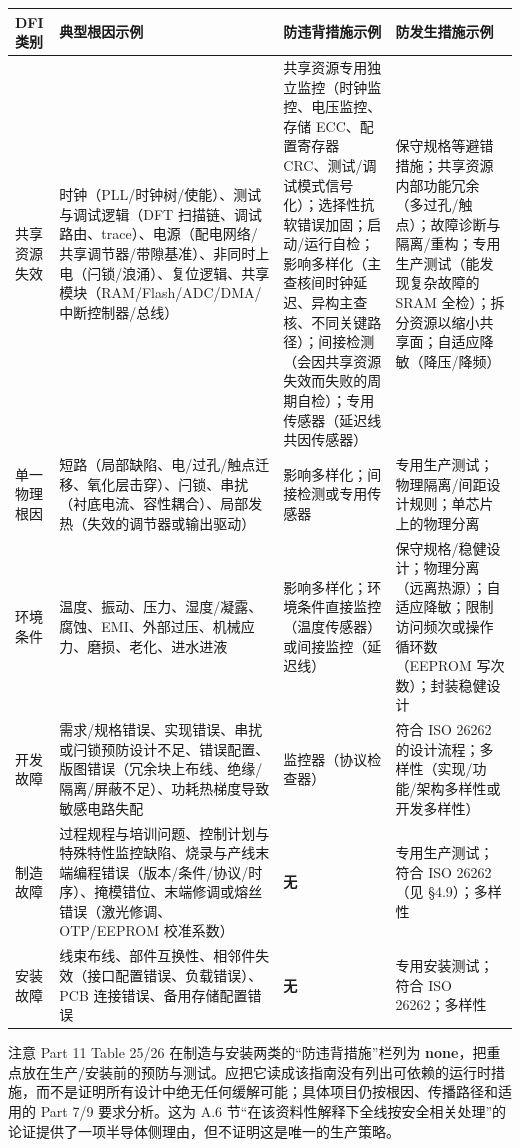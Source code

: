 \begingroup\small
\setlength{\tabcolsep}{4pt}
\begin{xltabular}{\linewidth}{@{}XXXX@{}}
\toprule
DFI 类别 & 典型根因示例 & 防违背措施示例 & 防发生措施示例 \\
\midrule
\endhead
共享资源失效 & 时钟（PLL/时钟树/使能）、测试与调试逻辑（DFT 扫描链、调试路由、trace）、电源（配电网络/共享调节器/带隙基准）、非同时上电（闩锁/浪涌）、复位逻辑、共享模块（RAM/Flash/ADC/DMA/中断控制器/总线） & 共享资源专用独立监控（时钟监控、电压监控、存储 ECC、配置寄存器 CRC、测试/调试模式信号化）；选择性抗软错误加固；启动/运行自检；影响多样化（主查核间时钟延迟、异构主查核、不同关键路径）；间接检测（会因共享资源失效而失败的周期自检）；专用传感器（延迟线共因传感器） & 保守规格等避错措施；共享资源内部功能冗余（多过孔/触点）；故障诊断与隔离/重构；专用生产测试（能发现复杂故障的 SRAM 全检）；拆分资源以缩小共享面；自适应降敏（降压/降频） \\
单一物理根因 & 短路（局部缺陷、电/过孔/触点迁移、氧化层击穿）、闩锁、串扰（衬底电流、容性耦合）、局部发热（失效的调节器或输出驱动） & 影响多样化；间接检测或专用传感器 & 专用生产测试；物理隔离/间距设计规则；单芯片上的物理分离 \\
环境条件 & 温度、振动、压力、湿度/凝露、腐蚀、EMI、外部过压、机械应力、磨损、老化、进水进液 & 影响多样化；环境条件直接监控（温度传感器）或间接监控（延迟线） & 保守规格/稳健设计；物理分离（远离热源）；自适应降敏；限制访问频次或操作循环数（EEPROM 写次数）；封装稳健设计 \\
开发故障 & 需求/规格错误、实现错误、串扰或闩锁预防设计不足、错误配置、版图错误（冗余块上布线、绝缘/隔离/屏蔽不足）、功耗热梯度导致敏感电路失配 & 监控器（协议检查器） & 符合 ISO 26262 的设计流程；多样性（实现/功能/架构多样性或开发多样性） \\
制造故障 & 过程规程与培训问题、控制计划与特殊特性监控缺陷、烧录与产线末端编程错误（版本/条件/协议/时序）、掩模错位、末端修调或熔丝错误（激光修调、OTP/EEPROM 校准系数） & \textbf{无} & 专用生产测试；符合 ISO 26262（见 §4.9）；多样性 \\
安装故障 & 线束布线、部件互换性、相邻件失效（接口配置错误、负载错误）、PCB 连接错误、备用存储配置错误 & \textbf{无} & 专用安装测试；符合 ISO 26262；多样性 \\
\bottomrule
\end{xltabular}
\endgroup

注意 Part 11 Table 25/26 在制造与安装两类的“防违背措施”栏列为 \textbf{none}，把重点放在生产/安装前的预防与测试。应把它读成该指南没有列出可依赖的运行时措施，而不是证明所有设计中绝无任何缓解可能；具体项目仍按根因、传播路径和适用的 Part 7/9 要求分析。这为 A.6 节“在该资料性解释下全线按安全相关处理”的论证提供了一项半导体侧理由，但不证明这是唯一的生产策略。

